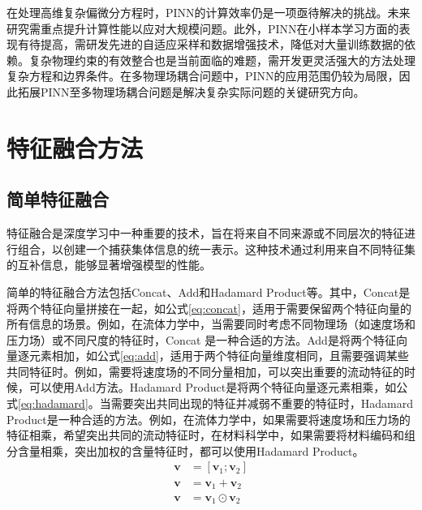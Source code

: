 在处理高维复杂偏微分方程时，PINN的计算效率仍是一项亟待解决的挑战。未来研究需重点提升计算性能以应对大规模问题\cite{Shah2024BenchmarkingQA-PINN}。此外，PINN在小样本学习方面的表现有待提高，需研发先进的自适应采样和数据增强技术，降低对大量训练数据的依赖。复杂物理约束的有效整合也是当前面临的难题，需开发更灵活强大的方法处理复杂方程和边界条件。在多物理场耦合问题中，PINN的应用范围仍较为局限\cite{Hillebrecht2022Certified,Haitsiukevich2023Improved}，因此拓展PINN至多物理场耦合问题是解决复杂实际问题的关键研究方向。

\section{特征融合方法}
\subsection{简单特征融合}
特征融合是深度学习中一种重要的技术，旨在将来自不同来源或不同层次的特征进行组合，以创建一个捕获集体信息的统一表示。这种技术通过利用来自不同特征集的互补信息，能够显著增强模型的性能。

简单的特征融合方法包括Concat、Add和Hadamard Product等。其中，Concat是将两个特征向量拼接在一起，如公式\eqref{eq:concat}，适用于需要保留两个特征向量的所有信息的场景。例如，在流体力学中，当需要同时考虑不同物理场（如速度场和压力场）或不同尺度的特征时，Concat 是一种合适的方法。Add是将两个特征向量逐元素相加，如公式\eqref{eq:add}，适用于两个特征向量维度相同，且需要强调某些共同特征时。例如，需要将速度场的不同分量相加，可以突出重要的流动特征的时候，可以使用Add方法。Hadamard Product是将两个特征向量逐元素相乘，如公式\eqref{eq:hadamard}。当需要突出共同出现的特征并减弱不重要的特征时，Hadamard Product是一种合适的方法。例如，在流体力学中，如果需要将速度场和压力场的特征相乘，希望突出共同的流动特征时，在材料科学中，如果需要将材料编码和组分含量相乘，突出加权的含量特征时，都可以使用Hadamard Product。
\begin{align}
  \mathbf{v} & = [\mathbf{v}_1; \mathbf{v}_2] \label{eq:concat}          \\
  \mathbf{v} & = \mathbf{v}_1 + \mathbf{v}_2    \label{eq:add}           \\
  \mathbf{v} & = \mathbf{v}_1 \odot \mathbf{v}_2     \label{eq:hadamard}
\end{align}

